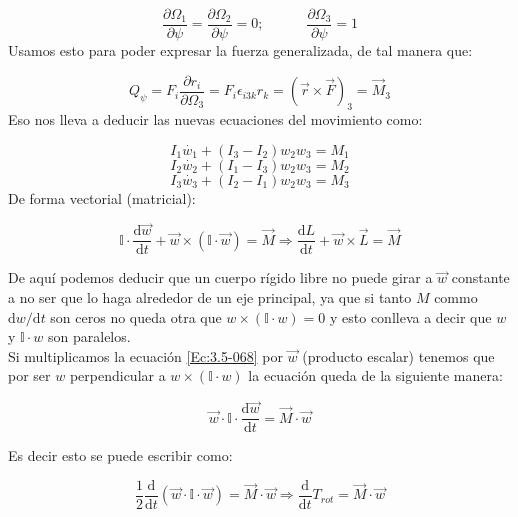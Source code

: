 \documentclass[12pt,a4paper]{book}
\newcommand{\parciales}[2]{\frac{\partial #1}{\partial #2}}
\newcommand{\D}{\mathrm{d}}
\newcommand{\tquad}{\quad \quad \quad}
\begin{document}
\begin{equation}
\parciales{\Omega_1}{\psi} = 
\parciales{\Omega_2}{\psi} = 0; \tquad 
\parciales{\Omega_3}{\psi} = 1
\end{equation}
Usamos esto para poder expresar la fuerza generalizada, de tal manera que:

\begin{equation}
Q_\psi = F_i \parciales{r_i}{\Omega_3} = F_i \epsilon_{i3k} r_k = (\vec{r} \times \vec{F})_3 = \vec{M}_3
\end{equation}
Eso nos lleva a deducir las nuevas ecuaciones del movimiento como:


\begin{equation}
I_1 \dot{w_1} + (I_3 -I_2) w_2 w_3 = M_1
\end{equation}
\begin{equation}
I_2 \dot{w_2} + (I_1 -I_3) w_2 w_3 = M_2
\end{equation}
\begin{equation}
I_3 \dot{w_3} + (I_2 -I_1) w_2 w_3 = M_3
\end{equation}
De forma vectorial (matricial):

\begin{equation}
\mathbb{I} \cdot \dfrac{\D \vec{w}}{\D t} + \vec{w} \times (\mathbb{I} \cdot \vec{w}) = \vec{M} \Longrightarrow \dfrac{\D L}{\D t} + \vec{w} \times \vec{L} = \vec{M} \label{Ec:3.5-068}
\end{equation}

De aquí podemos deducir que un cuerpo rígido libre no puede girar a $\vec{w}$ constante a no ser que lo haga alrededor de un eje principal, ya que si tanto $M$ commo $\D w/ \D t $ son ceros no queda otra que $w \times (\mathbb{I } \cdot w) = 0$ y esto conlleva a decir que $w$ y $\mathbb{I} \cdot w$ son paralelos. \\

Si multiplicamos la ecuación \ref{Ec:3.5-068} por $\vec{w}$ (producto escalar) tenemos que por ser $w$ perpendicular a $w \times (\mathbb{I} \cdot w)$ la ecuación queda de la siguiente manera:

\begin{equation}
\vec{w} \cdot \mathbb{I} \cdot \dfrac{\D \vec{w}}{\D t} = \vec{M} \cdot \vec{w}
\end{equation}

Es decir esto se puede escribir como:

\begin{equation}
\dfrac{1}{2} \dfrac{\D }{\D t} (\vec{w} \cdot \mathbb{I} \cdot \vec{w}) = \vec{M} \cdot \vec{w} \Longrightarrow \dfrac{\D}{\D t}T_{rot} = \vec{M} \cdot \vec{w}
\end{equation}
\end{document}
